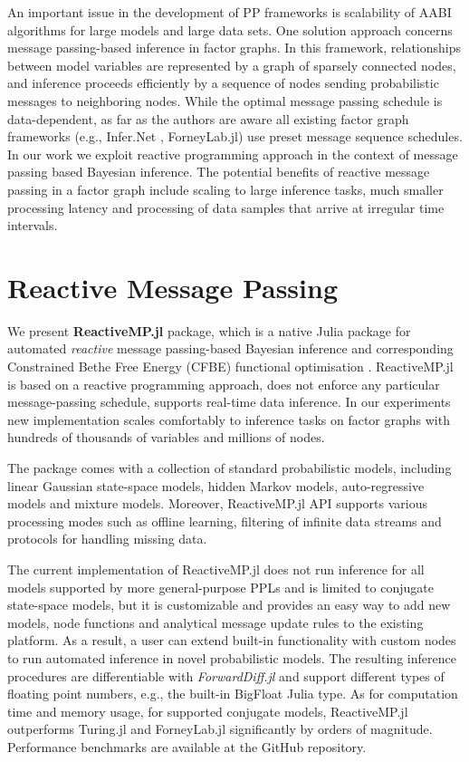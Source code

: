 \documentclass{juliacon}
\begin{document}
An important issue in the development of PP frameworks is scalability of AABI algorithms for large models and large data sets. 
One solution approach concerns message passing-based inference in factor graphs. In this framework, relationships between model variables are represented by a graph of sparsely connected nodes, 
and inference proceeds efficiently by a sequence of nodes sending probabilistic messages to neighboring nodes. While the optimal message passing schedule is data-dependent, as far as the authors are aware
all existing factor graph frameworks (e.g., Infer.Net \cite{InferNET18}, ForneyLab.jl) use preset message sequence schedules. In our work we exploit reactive programming approach in the context of message passing 
based Bayesian inference. The potential benefits of reactive message passing in a factor graph include scaling to large inference tasks, much smaller processing latency and processing of data samples that arrive at irregular time intervals.

\section{Reactive Message Passing}

We present \textbf{ReactiveMP.jl} package, which is a native Julia \cite{bezanson2017julia} package for automated \textit{reactive} message passing-based Bayesian inference and corresponding
Constrained Bethe Free Energy (CFBE) functional optimisation \cite{senoz_local_constraint_2021}. ReactiveMP.jl is based on a reactive programming approach, does not enforce any particular message-passing schedule, 
supports real-time data inference. In our experiments new implementation scales comfortably to inference tasks on factor graphs with hundreds of thousands of variables and millions of nodes.

The package comes with a collection of standard probabilistic models, including linear Gaussian state-space models, hidden Markov models, auto-regressive models and mixture models. 
Moreover, ReactiveMP.jl API supports various processing modes such as offline learning, filtering of infinite data streams and protocols for handling missing data.

The current implementation of ReactiveMP.jl does not run inference for all models supported by more general-purpose PPLs and is limited to conjugate state-space models, but it is customizable and provides an easy way to add new models, node functions and analytical message update rules to the existing platform. 
As a result, a user can extend built-in functionality with custom nodes to run automated inference in novel probabilistic models.
The resulting inference procedures are differentiable with \textit{ForwardDiff.jl} \cite{RevelsLubinPapamarkou2016} and support different types of floating point numbers, e.g., the built-in BigFloat Julia type.
As for computation time and memory usage, for supported conjugate models, ReactiveMP.jl outperforms Turing.jl and ForneyLab.jl significantly by orders of magnitude. Performance benchmarks are available at the GitHub repository.
\end{document}
